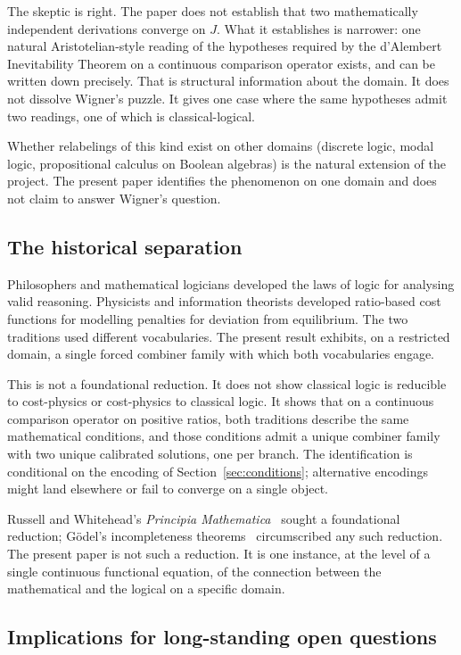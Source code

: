 \documentclass[11pt,a4paper]{article}
\theoremstyle{definition}
\theoremstyle{remark}
\begin{document}
The skeptic is right. The paper does not establish that two
mathematically independent derivations converge on $J$. What it
establishes is narrower: one natural Aristotelian-style reading of the
hypotheses required by the d'Alembert Inevitability Theorem on a
continuous comparison operator exists, and can be written down
precisely. That is structural information about the domain. It does
not dissolve Wigner's puzzle. It gives one case where the same
hypotheses admit two readings, one of which is classical-logical.

Whether relabelings of this kind exist on other domains (discrete
logic, modal logic, propositional calculus on Boolean algebras) is
the natural extension of the project. The present paper identifies the
phenomenon on one domain and does not claim to answer Wigner's
question.

\subsection{The historical separation}

Philosophers and mathematical logicians developed the laws of logic
for analysing valid reasoning. Physicists and information theorists
developed ratio-based cost functions for modelling penalties for
deviation from equilibrium. The two traditions used different
vocabularies. The present result exhibits, on a restricted domain, a
single forced combiner family with which both vocabularies engage.

This is not a foundational reduction. It does not show classical logic
is reducible to cost-physics or cost-physics to classical logic. It
shows that on a continuous comparison operator on positive ratios,
both traditions describe the same mathematical conditions, and those
conditions admit a unique combiner family with two unique calibrated
solutions, one per branch. The identification is conditional on the
encoding of Section~\ref{sec:conditions}; alternative encodings might
land elsewhere or fail to converge on a single object.

Russell and Whitehead's
\emph{Principia Mathematica}~\cite{RussellWhitehead1913} sought a
foundational reduction; G\"odel's incompleteness
theorems~\cite{Goedel1931} circumscribed any such reduction. The
present paper is not such a reduction. It is one instance, at the
level of a single continuous functional equation, of the connection
between the mathematical and the logical on a specific domain.

\subsection{Implications for long-standing open questions}\label{subsec:implications}
\end{document}
